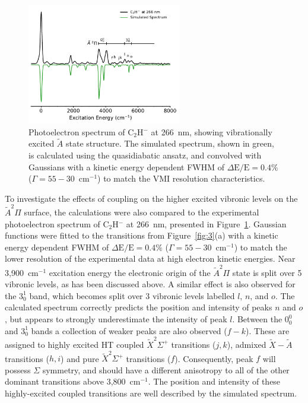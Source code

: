 \documentclass[journal=jpcafh,manuscript=article,layout=onecolumn, 12pt]{achemso}
\begin{document}
\begin{figure}[th!]
	\includegraphics[width=0.6\textwidth]{figures/266-plot.pdf}
	\caption{Photoelectron spectrum of C$_2$H$^-$ at 266~nm, showing vibrationally excited $\tilde{A}$ state structure. The simulated spectrum, shown in green, is calculated using the quasidiabatic ansatz, and convolved with Gaussians with a kinetic energy dependent FWHM of $\Delta\text{E}/\text{E} = 0.4\%$ ($\Gamma=55-30$~cm$^{-1}$) to match the VMI resolution characteristics.}
	\label{fig:4}
\end{figure}
To investigate the effects of coupling on the higher excited vibronic levels on the~$\tilde{A} ^2\Pi$ surface, the calculations were also compared to the experimental photoelectron spectrum of C$_2$H$^-$ at 266~nm, presented in Figure~\ref{fig:4}. Gaussian functions were fitted to the transitions from Figure~\ref{fig:3}(a) with a kinetic energy dependent FWHM of $\Delta\text{E}/\text{E} = 0.4\%$ ($\Gamma=55-30$~cm$^{-1}$) to match the lower resolution of the experimental data at high electron kinetic energies. Near 3,900~cm$^{-1}$ excitation energy the electronic origin of the $\tilde{A} ^2\Pi$ state is split over 5 vibronic levels, as has been discussed above. A similar effect is also observed for the $3^1_0$ band, which becomes split over 3 vibronic levels labelled $l$, $n$, and $o$. The calculated spectrum correctly predicts the position and intensity of peaks $n$ and $o$, but appears to strongly underestimate the intensity of peak $l$. Between the $0^0_0$ and $3^1_0$ bands a collection of weaker peaks are also observed ($f-k$). These are assigned to highly excited HT coupled $\tilde{X} ^2\Sigma^+$ transitions ($j,k$), admixed $\tilde{X}-\tilde{A}$ transitions ($h,i$) and pure $\tilde{X} ^2\Sigma^+$ transitions ($f$). Consequently, peak $f$ will possess $\Sigma$ symmetry, and should have a different anisotropy to all of the other dominant transitions above 3,800~cm$^{-1}$. The position and intensity of these highly-excited coupled transitions are well described by the simulated spectrum. 
\end{document}
